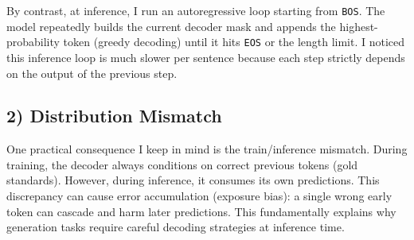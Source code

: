 \documentclass[11pt]{article}
\begin{document}
By contrast, at inference, I run an autoregressive loop starting from \texttt{BOS}. The model repeatedly builds the current decoder mask and appends the highest-probability token (greedy decoding) until it hits \texttt{EOS} or the length limit. I noticed this inference loop is much slower per sentence because each step strictly depends on the output of the previous step.

\subsection*{2) Distribution Mismatch}
One practical consequence I keep in mind is the train/inference mismatch. During training, the decoder always conditions on correct previous tokens (gold standards). However, during inference, it consumes its own predictions. This discrepancy can cause error accumulation (exposure bias): a single wrong early token can cascade and harm later predictions. This fundamentally explains why generation tasks require careful decoding strategies at inference time.
\end{document}
